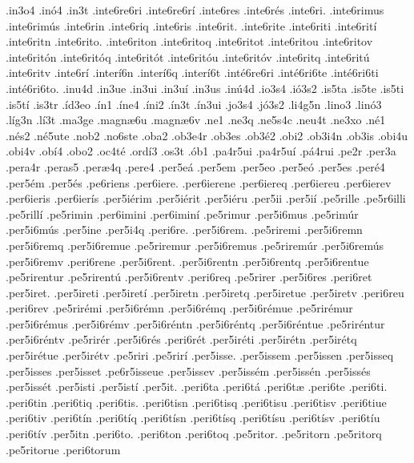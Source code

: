 {.in3o4
.in^^f34
.in3t
.inte6re6ri
.inte6re6r^^ed
.inte6res
.inte6r^^e9s
.inte6ri.
.inte6rimus
.inte6rim^^fas
.inte6rin
.inte6riq
.inte6ris
.inte6rit.
.inte6rite
.inte6riti
.inte6rit^^ed
.inte6ritn
.inte6rito.
.inte6riton
.inte6ritoq
.inte6ritot
.inte6ritou
.inte6ritov
.inte6rit^^f3n
.inte6rit^^f3q
.inte6rit^^f3t
.inte6rit^^f3u
.inte6rit^^f3v
.inte6ritq
.inte6rit^^fa
.inte6ritv
.inte6r^^ed
.inter^^ed6n
.inter^^ed6q
.inter^^ed6t
.int^^e96re6ri
.int^^e96ri6te
.int^^e96ri6ti
.int^^e96ri6to.
.inu4d
.in3ue
.in3ui
.in3u^^ed
.in3us
.in^^fa4d
.io3s4
.i^^f33s2
.is5ta
.is5te
.is5ti
.is5t^^ed
.is3tr
.^^edd3eo
.^^edn1
.^^edne4
.^^edni2
.^^edn3t
.^^edn3ui
.jo3s4
.j^^f33s2
.li4g5n
.lino3
.lin^^f33
.l^^edg3n
.l^^ed3t
.ma3ge
.magn^^e66u
.magn^^e66v
.ne1
.ne3q
.ne5s4c
.neu4t
.ne3xo
.n^^e91
.n^^e9s2
.n^^e95ute
.nob2
.no6ste
.oba2
.ob3e4r
.ob3es
.ob3^^e92
.obi2
.ob3i4n
.ob3is
.obi4u
.obi4v
.ob^^ed4
.obo2
.oc4t^^e9
.ord^^ed3
.os3t
.^^f3b1
.pa4r5ui
.pa4r5u^^ed
.p^^e14rui
.pe2r
.per3a
.pera4r
.peras5
.per^^e64q
.pere4
.per5e^^e1
.per5em
.per5eo
.per5e^^f3
.per5es
.per^^e94
.per5^^e9m
.per5^^e9s
.pe6riens
.per6iere.
.per6ierene
.per6iereq
.per6iereu
.per6ierev
.per6ieris
.per6ier^^eds
.per5i^^e9rim
.per5i^^e9rit
.per5i^^e9ru
.per5ii
.per5i^^ed
.pe5rille
.pe5r6illi
.pe5rill^^ed
.pe5rimin
.per6imini
.per6imin^^ed
.pe5rimur
.per5i6mus
.pe5rim^^far
.per5i6m^^fas
.per5ine
.per5i4q
.peri6re.
.per5i6rem.
.pe5riremi
.per5i6remn
.per5i6remq
.per5i6remue
.pe5riremur
.per5i6remus
.pe5rirem^^far
.per5i6rem^^fas
.per5i6remv
.peri6rene
.per5i6rent.
.per5i6rentn
.per5i6rentq
.per5i6rentue
.pe5rirentur
.pe5rirent^^fa
.per5i6rentv
.peri6req
.pe5rirer
.per5i6res
.peri6ret
.per5iret.
.per5ireti
.per5iret^^ed
.per5iretn
.per5iretq
.per5iretue
.per5iretv
.peri6reu
.peri6rev
.pe5rir^^e9mi
.per5i6r^^e9mn
.per5i6r^^e9mq
.per5i6r^^e9mue
.pe5rir^^e9mur
.per5i6r^^e9mus
.per5i6r^^e9mv
.per5i6r^^e9ntn
.per5i6r^^e9ntq
.per5i6r^^e9ntue
.pe5rir^^e9ntur
.per5i6r^^e9ntv
.pe5rir^^e9r
.per5i6r^^e9s
.peri6r^^e9t
.per5ir^^e9ti
.per5ir^^e9tn
.per5ir^^e9tq
.per5ir^^e9tue
.per5ir^^e9tv
.pe5riri
.pe5rir^^ed
.per5isse.
.per5issem
.per5issen
.per5isseq
.per5isses
.per5isset
.pe6r5isseue
.per5issev
.per5iss^^e9m
.per5iss^^e9n
.per5iss^^e9s
.per5iss^^e9t
.per5isti
.per5ist^^ed
.per5it.
.peri6ta
.peri6t^^e1
.peri6t^^e6
.peri6te
.peri6ti.
.peri6tin
.peri6tiq
.peri6tis.
.peri6tisn
.peri6tisq
.peri6tisu
.peri6tisv
.peri6tiue
.peri6tiv
.peri6t^^edn
.peri6t^^edq
.peri6t^^edsn
.peri6t^^edsq
.peri6t^^edsu
.peri6t^^edsv
.peri6t^^edu
.peri6t^^edv
.per5itn
.peri6to.
.peri6ton
.peri6toq
.pe5ritor.
.pe5ritorn
.pe5ritorq
.pe5ritorue
.peri6torum
}
